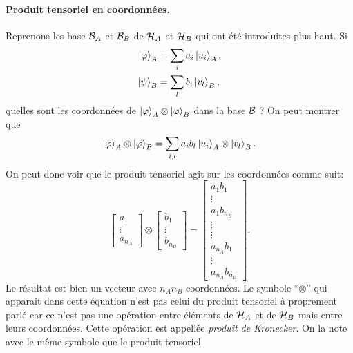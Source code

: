 \documentclass[11pt,a4paper,oneside]{article}
\begin{document}
\paragraph*{Produit tensoriel en coordonnées.} Reprenons les base $\mathcal{B}_A$ et $\mathcal{B}_B$ de $\mathcal{H}_A$ et $\mathcal{H}_B$ qui ont été introduites plus haut. Si
\begin{align}
    \ket{\varphi}_A &= \sum_i a_i\ket{u_i}_A,\\
    \ket{\psi}_B &= \sum_l b_i\ket{v_l}_B,
\end{align}
quelles sont les coordonnées de $\ket{\varphi}_A\otimes\ket{\varphi}_B$ dans la base $\mathcal{B}$ ? On peut montrer que
\begin{equation}
    \ket{\varphi}_A\otimes\ket{\varphi}_B = \sum_{i,l} a_ib_l\ket{u_i}_A\otimes\ket{v_l}_B.
\end{equation}
On peut donc voir que le produit tensoriel agit sur les coordonnées comme suit:
\begin{equation}
    \begin{bmatrix}
        a_1\\
        \vdots\\
        a_{n_A}
    \end{bmatrix}\otimes
    \begin{bmatrix}
        b_1\\
        \vdots\\
        b_{n_B}
    \end{bmatrix}=
    \begin{bmatrix}
        a_1b_1\\
        \vdots\\
        a_1b_{n_B}\\
        \vdots\\
        \vdots\\
        a_{n_A}b_1\\
        \vdots\\
        a_{n_A}b_{n_B}
    \end{bmatrix}.\label{eq:prodKronvecteurs}
\end{equation}
Le résultat est bien un vecteur avec $n_An_B$ coordonnées. Le symbole ``$\otimes$'' qui apparait dans cette équation n'est pas celui du produit tensoriel à proprement parlé car ce n'est pas une opération entre éléments de $\mathcal{H}_A$ et de $\mathcal{H}_B$ mais entre leurs coordonnées. Cette opération est appellée \emph{produit de Kronecker}. On la note avec le même symbole que le produit tensoriel.
\end{document}
